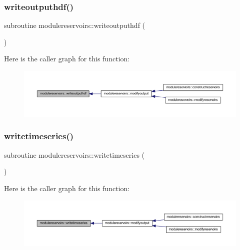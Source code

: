 \subsubsection{\texorpdfstring{writeoutputhdf()}{writeoutputhdf()}}
{\footnotesize\ttfamily subroutine modulereservoirs\+::writeoutputhdf (\begin{DoxyParamCaption}{ }\end{DoxyParamCaption})\hspace{0.3cm}{\ttfamily [private]}}

Here is the caller graph for this function\+:\nopagebreak
\begin{figure}[H]
\begin{center}
\leavevmode
\includegraphics[width=350pt]{namespacemodulereservoirs_acfc5816f94fa9d8f10e180691ee50039_icgraph}
\end{center}
\end{figure}
\mbox{\label{namespacemodulereservoirs_a8f4552bc7aa4adbe0bb04d768353a7b4}} 
\subsubsection{\texorpdfstring{writetimeseries()}{writetimeseries()}}
{\footnotesize\ttfamily subroutine modulereservoirs\+::writetimeseries (\begin{DoxyParamCaption}{ }\end{DoxyParamCaption})\hspace{0.3cm}{\ttfamily [private]}}

Here is the caller graph for this function\+:\nopagebreak
\begin{figure}[H]
\begin{center}
\leavevmode
\includegraphics[width=350pt]{namespacemodulereservoirs_a8f4552bc7aa4adbe0bb04d768353a7b4_icgraph}
\end{center}
\end{figure}


